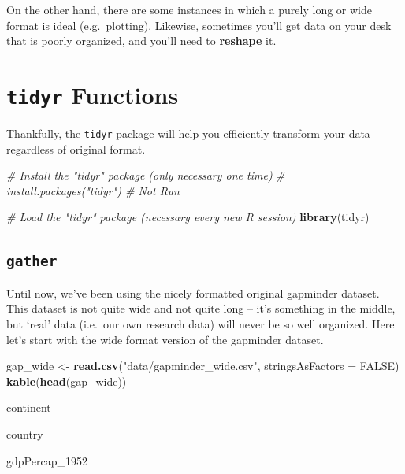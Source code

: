 \documentclass[]{book}
\newenvironment{Shaded}{\begin{snugshade}}{\end{snugshade}}
\newcommand{\CommentTok}[1]{\textcolor[rgb]{0.56,0.35,0.01}{\textit{#1}}}
\newcommand{\DataTypeTok}[1]{\textcolor[rgb]{0.13,0.29,0.53}{#1}}
\newcommand{\KeywordTok}[1]{\textcolor[rgb]{0.13,0.29,0.53}{\textbf{#1}}}
\newcommand{\NormalTok}[1]{#1}
\newcommand{\OtherTok}[1]{\textcolor[rgb]{0.56,0.35,0.01}{#1}}
\newcommand{\StringTok}[1]{\textcolor[rgb]{0.31,0.60,0.02}{#1}}
\begin{document}
On the other hand, there are some instances in which a purely long or wide format is ideal (e.g.~plotting). Likewise, sometimes you'll get data on your desk that is poorly organized, and you'll need to \textbf{reshape} it.

\hypertarget{tidyr-functions}{%
\section{\texorpdfstring{\texttt{tidyr} Functions}{tidyr Functions}}\label{tidyr-functions}}

Thankfully, the \texttt{tidyr} package will help you efficiently transform your data regardless of original format.

\begin{Shaded}
\begin{Highlighting}[]
\CommentTok{# Install the "tidyr" package (only necessary one time)}
\CommentTok{# install.packages("tidyr") # Not Run}

\CommentTok{# Load the "tidyr" package (necessary every new R session)}
\KeywordTok{library}\NormalTok{(tidyr)}
\end{Highlighting}
\end{Shaded}

\hypertarget{gather}{%
\subsection{\texorpdfstring{\texttt{gather}}{gather}}\label{gather}}

Until now, we've been using the nicely formatted original gapminder dataset. This dataset is not quite wide and not quite long -- it's something in the middle, but `real' data (i.e.~our own research data) will never be so well organized. Here let's start with the wide format version of the gapminder dataset.

\begin{Shaded}
\begin{Highlighting}[]
\NormalTok{gap_wide <-}\StringTok{ }\KeywordTok{read.csv}\NormalTok{(}\StringTok{"data/gapminder_wide.csv"}\NormalTok{, }\DataTypeTok{stringsAsFactors =} \OtherTok{FALSE}\NormalTok{)}
\KeywordTok{kable}\NormalTok{(}\KeywordTok{head}\NormalTok{(gap_wide))}
\end{Highlighting}
\end{Shaded}

continent

country

gdpPercap\_1952
\end{document}
